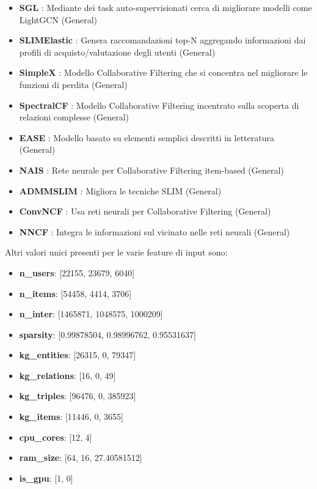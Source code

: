 \begin{itemize}
    \item \textbf{SGL} \cite{SGL}: Mediante dei task auto-supervisionati cerca di migliorare modelli come LightGCN (General)
    \item \textbf{SLIMElastic} \cite{SLIMElastic}: Genera raccomandazioni top-N aggregando informazioni dai profili di acquisto/valutazione degli utenti (General)
    \item \textbf{SimpleX} \cite{SimpleX}: Modello Collaborative Filtering che si concentra nel migliorare le funzioni di perdita (General)
    \item \textbf{SpectralCF} \cite{SpectralCF}: Modello Collaborative Filtering incentrato sulla scoperta di relazioni complesse (General)
    \item \textbf{EASE} \cite{EASE}: Modello basato su elementi semplici descritti in letteratura (General)
    \item \textbf{NAIS} \cite{NAIS}: Rete neurale per Collaborative Filtering item-based (General)
    \item \textbf{ADMMSLIM} \cite{ADMMSLIM}: Migliora le tecniche SLIM (General)
    \item \textbf{ConvNCF} \cite{ConvNCF}: Usa reti neurali per Collaborative Filtering (General)
    \item \textbf{NNCF} \cite{NNCF}: Integra le informazioni sul vicinato nelle reti neurali (General)
\end{itemize}

Altri valori unici presenti per le varie feature di input sono:
\begin{itemize}
    \item \textbf{n\_users}: [22155, 23679, 6040]
    \item \textbf{n\_items}: [54458, 4414, 3706]
    \item \textbf{n\_inter}: [1465871, 1048575, 1000209]
    \item \textbf{sparsity}: [0.99878504, 0.98996762, 0.95531637]
    \item \textbf{kg\_entities}: [26315, 0, 79347]
    \item \textbf{kg\_relations}: [16, 0, 49]
    \item \textbf{kg\_triples}: [96476, 0, 385923]
    \item \textbf{kg\_items}: [11446, 0, 3655]
    \item \textbf{cpu\_cores}: [12, 4]
    \item \textbf{ram\_size}: [64, 16, 27.40581512]
    \item \textbf{is\_gpu}: [1, 0]
\end{itemize}
